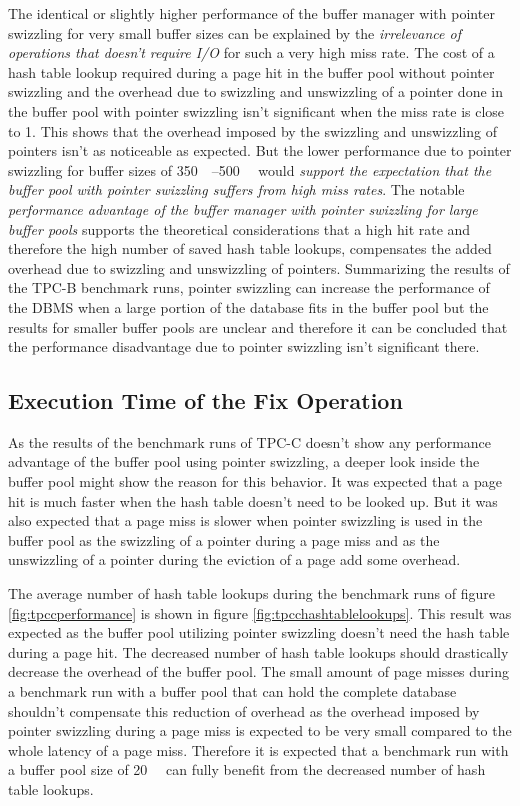 	The identical or slightly higher performance of the buffer manager with pointer swizzling for very small buffer sizes can be explained by the \emph{irrelevance of operations that doesn't require I/O} for such a very high miss rate. The cost of a hash table lookup required during a page hit in the buffer pool without pointer swizzling and the overhead due to swizzling and unswizzling of a pointer done in the buffer pool with pointer swizzling isn't significant when the miss rate is close to 1. This shows that the overhead imposed by the swizzling and unswizzling of pointers isn't as noticeable as expected. But the lower performance due to pointer swizzling for buffer sizes of \SIrange{350}{500}{\mebi\byte} would \emph{support the expectation that the buffer pool with pointer swizzling suffers from high miss rates}. The notable \emph{performance advantage of the buffer manager with pointer swizzling for large buffer pools} supports the theoretical considerations that a high hit rate and therefore the high number of saved hash table lookups, compensates the added overhead due to swizzling and unswizzling of pointers. Summarizing the results of the TPC-B benchmark runs, pointer swizzling can increase the performance of the DBMS when a large portion of the database fits in the buffer pool but the results for smaller buffer pools are unclear and therefore it can be concluded that the performance disadvantage due to pointer swizzling isn't significant there.
	
\subsection{Execution Time of the Fix Operation}
	
	As the results of the benchmark runs of TPC-C doesn't show any performance advantage of the buffer pool using pointer swizzling, a deeper look inside the buffer pool might show the reason for this behavior. It was expected that a page hit is much faster when the hash table doesn't need to be looked up. But it was also expected that a page miss is slower when pointer swizzling is used in the buffer pool as the swizzling of a pointer during a page miss and as the unswizzling of a pointer during the eviction of a page add some overhead.
	
	The average number of hash table lookups during the benchmark runs of figure \ref{fig:tpccperformance} is shown in figure \ref{fig:tpcchashtablelookups}. This result was expected as the buffer pool utilizing pointer swizzling doesn't need the hash table during a page hit. The decreased number of hash table lookups should drastically decrease the overhead  of the buffer pool. The small amount of page misses during a benchmark run with a buffer pool that can hold the complete database shouldn't compensate this reduction of overhead as the overhead imposed by pointer swizzling during a page miss is expected to be very small compared to the whole latency of a page miss. Therefore it is expected that a benchmark run with a buffer pool size of \SI{20}{\gibi\byte} can fully benefit from the decreased number of hash table lookups.
	
